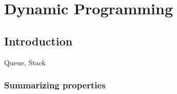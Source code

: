 \chapter{Dynamic Programming}
\section{Introduction}
Queue, Stack


\subsection{Summarizing properties}

